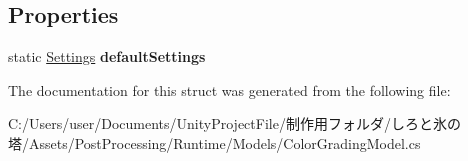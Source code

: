 \subsection*{Properties}
\begin{DoxyCompactItemize}
\item 
\mbox{\label{struct_unity_engine_1_1_post_processing_1_1_color_grading_model_1_1_settings_a56e20088ac2842af86cf031e7554b428}} 
static \hyperlink{struct_unity_engine_1_1_post_processing_1_1_color_grading_model_1_1_settings}{Settings} {\bfseries default\+Settings}
\end{DoxyCompactItemize}


The documentation for this struct was generated from the following file\+:\begin{DoxyCompactItemize}
\item 
C\+:/\+Users/user/\+Documents/\+Unity\+Project\+File/制作用フォルダ/しろと氷の塔/\+Assets/\+Post\+Processing/\+Runtime/\+Models/Color\+Grading\+Model.\+cs\end{DoxyCompactItemize}

